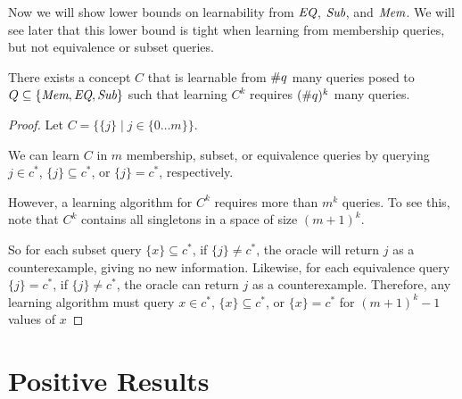 Now we will show lower bounds on learnability from $\emph{EQ}$, $\emph{Sub}$, and $\emph{Mem}$. 
We will see later that this lower bound is tight when learning from membership queries, but not equivalence or subset queries.


\begin{proposition}
There exists a concept $C$ that is learnable from $\#q$ many queries posed to $Q \subseteq \{ \emph{Mem}, \emph{EQ}, \emph{Sub} \}$ such that learning $C^k$ requires $(\#q)^k$ many queries.   
\end{proposition}
\begin{proof}
Let $C = \{ \{j\} \mid j \in \{0 \dots m\} \}$. 

We can learn $C$ in $m$ membership, subset, or equivalence queries by querying $j \in c^*$, $\{ j \} \subseteq c^*$, or $\{j\} = c^*$, respectively. 

However, a learning algorithm for $C^k$ requires more than $m^k$ queries. 
To see this, note that  $C^k$ contains all singletons in a space of size $(m+1)^k$. 

So for each subset query $\{x\} \subseteq c^*$, if $\{j\} \ne c^*$, the oracle will return $j$ as a counterexample, giving no new information.  
Likewise, for each equivalence query $\{j\} = c^*$, if $\{j\} \ne c^*$, the oracle can return $j$ as a counterexample.
Therefore, any learning algorithm must query $x \in c^*$, $\{ x \} \subseteq c^*$, or $\{x\} = c^*$ for $(m+1)^k - 1$ values of $x$
\end{proof}


\section{Positive Results}


